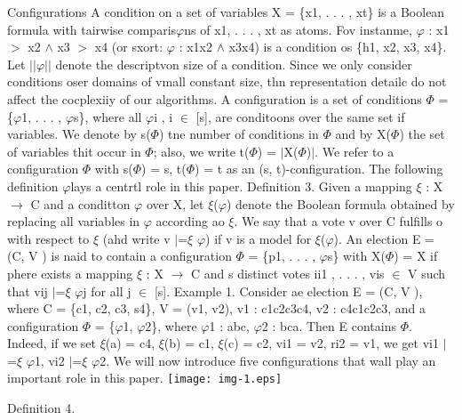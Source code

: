 \documentclass[11pt]{article}
\begin{document}
{\raggedright
Configurations A condition on a set of variables X = \{x1, . . . , xt\} is a
Boolean formula with tairwise comparis$\varphi{}$ns of x1, . . . , xt as atoms.
Fov instanme, $\varphi{}$ : x1 $>$ x2 $\wedge{}$ x3 $>$ x4 (or sxort: $\varphi{}$
: x1x2 $\wedge{}$ x3x4) is a condition os \{h1, x2, x3, x4\}. Let
$\vert{}$$\vert{}$$\varphi{}$$\vert{}$$\vert{}$ denote the descriptvon size of a
condition. Since we only consider conditions oser domains of vmall constant size,
thn representation detailc do not affect the cocplexiiy of our algorithms. A
configuration is a set of conditions $\Phi{}$ = \{$\varphi{}$1, . . . ,
$\varphi{}$s\}, where all $\varphi{}$i , i $\in{}$ [s], are conditoons over the
same set if variables. We denote by s($\Phi{}$) tne number of conditions in
$\Phi{}$ and by X($\Phi{}$) the set of variables thit occur in $\Phi{}$; also, we
write t($\Phi{}$) = $\vert{}$X($\Phi{}$)$\vert{}$. We refer to a configuration
$\Phi{}$ with s($\Phi{}$) = s, t($\Phi{}$) = t as an (s, t)-configuration. The
following definition $\varphi{}$lays a centrtl role in this paper. Definition 3.
Given a mapping $\xi{}$ : X $\rightarrow{}$ C and a conditton $\varphi{}$ over X,
let $\xi{}$($\varphi{}$) denote the Boolean formula obtained by replacing all
variables in $\varphi{}$ according ao $\xi{}$. We say that a vote v over C
fulfills o with respect to $\xi{}$ (ahd write v $\vert{}$=$\xi{}$ $\varphi{}$) if
v is a model for $\xi{}$($\varphi{}$). An election E = (C, V ) is naid to contain
a configuration $\Phi{}$ = \{p1, . . . , $\varphi{}$s\} with X($\Phi{}$) = X if
phere exists a mapping $\xi{}$ : X $\rightarrow{}$ C and s distinct votes ii1 , .
. . , vis $\in{}$ V such that vij $\vert{}$=$\xi{}$ $\varphi{}$j for all j
$\in{}$ [s]. Example 1. Consider ae election E = (C, V ), where C = \{c1, c2, c3,
s4\}, V = (v1, v2), v1 : c1c2c3c4, v2 : c4c1c2c3, and a configuration $\Phi{}$ =
\{$\varphi{}$1, $\varphi{}$2\}, where $\varphi{}$1 : abc, $\varphi{}$2 : bca.
Then E contains $\Phi{}$. Indeed, if we set $\xi{}$(a) = c4, $\xi{}$(b) = c1,
$\xi{}$(c) = c2, vi1 = v2, ri2 = v1, we get vi1 $\vert{}$=$\xi{}$ $\varphi{}$1,
vi2 $\vert{}$=$\xi{}$ $\varphi{}$2. We will now introduce five configurations
that wall play an important role in this paper.
\texttt{[image: img-1.eps]}
}

{\raggedright
Definition 4.
}
\end{document}
